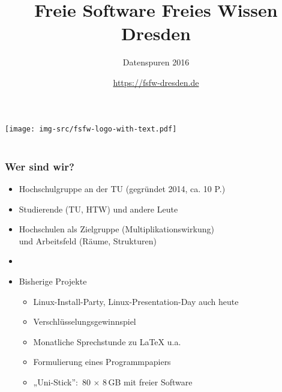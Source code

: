 \documentclass[t]{beamer}
\title{Freie Software Freies Wissen Dresden}
\subtitle{Datenspuren 2016}
\author{\url{https://fsfw-dresden.de}}
\begin{document}
\begin{frame}
  \begin{center}%
    \texttt{[image: img-src/fsfw-logo-with-text.pdf]}\\%
    \vspace*{-1em}{Freie Software Freies Wissen}\\[1em]
  \end{center}
\end{frame}

\begin{frame}[label=ct1]
  \frametitle{Wer sind wir?}

  \begin{itemize}
  \item Hochschulgruppe an der TU (gegründet 2014, ca. 10 P.)
  \item Studierende (TU, HTW) und andere Leute
  \item Hochschulen als Zielgruppe (Multiplikationswirkung)\\
    und Arbeitsfeld (Räume, Strukturen)
  \item[]
    \pause
  \item Bisherige Projekte
    \begin{itemize}
    \item Linux-Install-Party, Linux-Presentation-Day {\tiny auch heute}
    \item Verschlüsselungsgewinnspiel
    \item Monatliche Sprechstunde zu \LaTeX{} u.a.
    \item Formulierung eines Programmpapiers
    \item „Uni-Stick”:~80 $\times$ 8\,GB mit freier Software
    \end{itemize}
  \end{itemize}
\end{frame}
\end{document}

